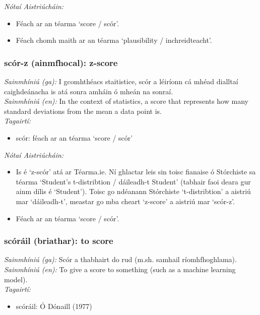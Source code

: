  \noindent \textit{Nótaí Aistriúcháin:}
\begin{itemize}
	\item Féach ar an téarma `score / scór'.
	\item Féach chomh maith ar an téarma `plausibility / inchreidteacht'.
\end{itemize}


\subsubsection*{scór-z (ainmfhocal): z-score}
 \noindent \textit{Sainmhíniú (ga):} I gcomhthéacs staitistice, scór a léiríonn cá mhéad dialltaí caighdeánacha is atá sonra amháin ó mheán na sonraí.
\\
 \noindent \textit{Sainmhíniú (en):} In the context of statistics, a score that represents how many standard deviations from the mean a data point is.
\\
 \noindent \textit{Tagairtí:}
\begin{itemize}
	\item scór: féach ar an téarma `score / scór'
\end{itemize}

 \noindent \textit{Nótaí Aistriúcháin:}
\begin{itemize}
	\item Is é `z-scór' atá ar Téarma.ie. Ní ghlactar leis sin toisc fianaise ó Stórchiste sa téarma `Student's t-distribtion / dáileadh-t Student' (tabhair faoi deara gur ainm dílis é `Student'). Toisc go ndéanann Stórchiste `t-distribtion' a aistriú mar `dáileadh-t', meastar go mba cheart `z-score' a aistriú mar `scór-z'.
	\item Féach ar an téarma `score / scór'.
\end{itemize}


\subsubsection*{scóráil (briathar): to score}
 \noindent \textit{Sainmhíniú (ga):} Scór a thabhairt do rud (m.sh. samhail ríomhfhoghlama).
\\
 \noindent \textit{Sainmhíniú (en):} To give a score to something (such as a machine learning model).
\\
 \noindent \textit{Tagairtí:}
\begin{itemize}
	\item scóráil: Ó Dónaill (1977) \cite{odonaill}
\end{itemize}

